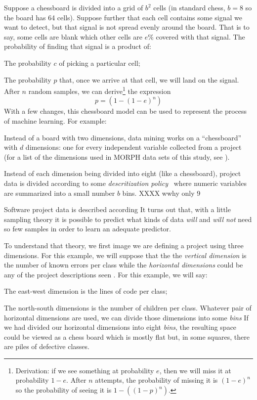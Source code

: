 Suppose a chessboard is divided into a grid of $b^2$ cells (in standard chess, $b=8$ so the board has 64 cells). Suppose further that each cell
contains some signal we want to detect, but that signal is not spread evenly around the board. That is to say, some cells are blank which other cells are $e$\% covered
with that signal. The probability of finding that signal is a product of:
\bi
\item The probability $c$ of picking a particular cell;
\item The probability $p$ that, once we arrive at that cell, we will land on the  signal.
After $n$ random samples, we can derive\footnote{Derivation: if we see something at probability $e$, then we will miss it at probability $1-e$.
After $n$ attempts, the probability of missing it is $(1-e)^n$ so the probability of seeing it is $1-((1-p)^n)$.}
the expression\begin{equation}\label{eq:p}
p= (1-(1-e)^n)
\end{equation}
With a few changes, this chessboard model can be
used to represent the process of machine
learning. For example:
\bi
\item
Instead of a board with two
dimensions, data mining works on a ``chessboard''
with $d$ dimensions: one for every independent
variable collected from a project (for a list of the
dimensions used in MORPH data sets of this study,
see ).
\item
Instead of each dimension being divided into eight (like a chessboard), project data is divided according to some {\em descritization policy}~\cite{lust08}
where numeric variables are summarized into a small number $b$ bins. XXXX wwhy only 9

Software project data is described according
It turns out that, with a little sampling theory
it is possible to predict what kinds of data {\em will} and {\em will not} need so few samples in order to learn an adequate predictor.

To understand that theory, we first image we are defining a  project using three dimensions.
For this example, we will suppose that the
the {\em vertical dimension} is the number of known errors per class while
the {\em horizontal dimensions} could be any of the project descriptions seen . For this example, we will say:
  \bi
  \item The east-west dimension is the lines of code per class;
  \item The north-south dimensions is the number of children per class.
    \ei
    Whatever pair of horizontal dimensions are used, we can divide those dimensions into some {\em bins}
    If we had  divided our horizontal dimensions into eight {\em bins}, the resulting space
    could be viewed as a chess board which is mostly flat but, in some squares, there
    are piles of defective classes.

